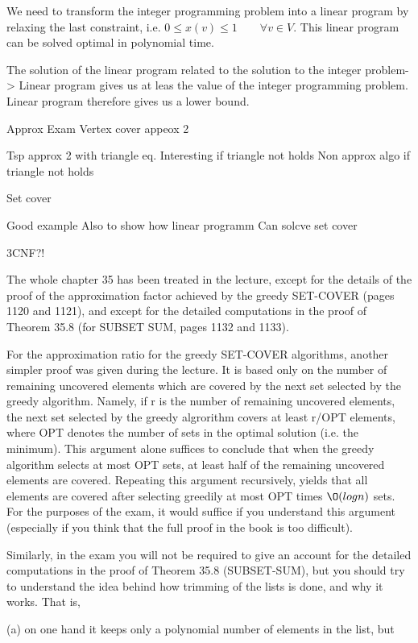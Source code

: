 \documentclass[10pt]{article}
\begin{document}
We need to transform the integer programming problem into a linear program by relaxing the last constraint, i.e. $0 \leq x(v) \leq 1 \qquad \forall v \in V$. This linear program can be solved optimal in polynomial time. 

The solution of the linear program related to the solution to the integer problem-> Linear program gives us at leas the value of the integer programming problem. Linear program therefore gives us a lower bound.

Approx Exam
Vertex cover appeox 2

Tsp approx 2 with triangle eq. Interesting if triangle not holds
Non approx algo if triangle not holds

Set cover

Good example Also to show how linear programm Can solcve set cover

3CNF?!               

The whole chapter 35 has been treated in the lecture, except for the details of the proof of the approximation factor achieved by the greedy SET-COVER (pages 1120 and 1121), and except for the detailed computations in the proof of Theorem 35.8 (for  SUBSET SUM, pages 1132 and 1133).

For the approximation ratio for the greedy SET-COVER algorithms, another simpler proof was given during the lecture. It is based only on the number of remaining uncovered elements which are covered by the next set  selected by the greedy algorithm. Namely, if r is the number of remaining uncovered elements, the next set selected by the greedy algrorithm covers at least r/OPT elements, where OPT denotes the number of sets in the optimal solution (i.e. the minimum). This argument alone suffices to conclude that when the greedy algorithm selects at most OPT sets,  at least half of the remaining uncovered elements are covered. Repeating this argument recursively, yields that all elements are covered after selecting greedily at most OPT times $\O(log n)$ sets. For the purposes of the exam, it would suffice if you understand this argument (especially if you think that the full proof in the book is too difficult).

Similarly, in the exam you will not be required to give an account for the detailed computations in the proof of Theorem 35.8 (SUBSET-SUM), but you should try to understand the idea behind how trimming of the lists is done, and why it works. That is,

(a) on one hand it keeps only a polynomial number of elements in the list, but
\end{document}
